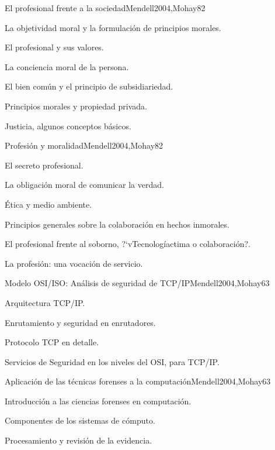 \begin{syllabus}
\begin{unit}{El profesional frente a la sociedad}{Mendell2004,Mohay}{8}{2}
\begin{topics}
      \item {La objetividad moral y la formulación de principios morales.}
      \item {El profesional y sus valores.}
      \item {La conciencia moral de la persona.}
      \item {El bien común y el principio de subsidiariedad.}
      \item {Principios morales y propiedad privada.}
      \item {Justicia, algunos conceptos básicos.}
\end{topics}
\end{unit}

\begin{unit}{Profesión y moralidad}{Mendell2004,Mohay}{8}{2}
\begin{topics}
      \item {El secreto profesional.}
      \item {La obligación moral de comunicar la verdad.}
      \item {Ética y medio ambiente.}
      \item {Principios generales sobre la colaboración en hechos inmorales.}
      \item {El profesional frente al soborno, ?`vTecnologíactima o colaboración?.}
      \item {La profesión: una vocación de servicio.}
\end{topics}
\end{unit}

\begin{unit}{Modelo OSI/ISO: Análisis de seguridad de TCP/IP}{Mendell2004,Mohay}{6}{3}
\begin{topics}
      \item {Arquitectura TCP/IP.}
      \item {Enrutamiento y seguridad en enrutadores.}
      \item {Protocolo TCP en detalle.}
      \item {Servicios de Seguridad en los niveles del OSI, para TCP/IP.}
\end{topics}
\end{unit}

\begin{unit}{Aplicación de las técnicas forenses a la computación}{Mendell2004,Mohay}{6}{3}
\begin{topics}
      \item {Introducción a las ciencias forenses en computación.}
      \item {Componentes de los sistemas de cómputo.}
      \item {Procesamiento y revisión de la evidencia.}
\end{topics}
\end{unit}


\end{syllabus}
